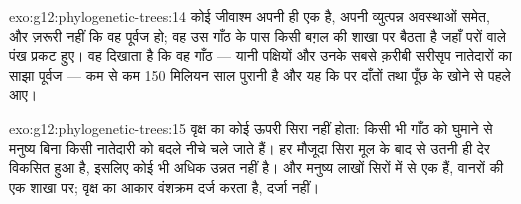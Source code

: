 \begin{solution}{exo:g12:phylogenetic-trees:14}
कोई जीवाश्म अपनी ही एक  है, अपनी व्युत्पन्न अवस्थाओं समेत, और ज़रूरी
नहीं कि वह पूर्वज  हो; वह उस गाँठ के पास किसी बग़ल की शाखा पर बैठता है
जहाँ परों वाले पंख प्रकट हुए। वह दिखाता है कि वह गाँठ --- यानी पक्षियों और
उनके सबसे क़रीबी सरीसृप नातेदारों का साझा पूर्वज --- कम से कम 150 मिलियन
साल पुरानी है और यह कि पर दाँतों तथा पूँछ के खोने से पहले आए।
\end{solution}

\begin{solution}{exo:g12:phylogenetic-trees:15}
वृक्ष का कोई ऊपरी सिरा नहीं होता: किसी भी गाँठ को घुमाने से मनुष्य बिना
किसी नातेदारी को बदले नीचे चले जाते हैं। हर मौजूदा सिरा मूल के बाद से उतनी
ही देर विकसित हुआ है, इसलिए कोई भी अधिक उन्नत नहीं है। और मनुष्य लाखों
सिरों में से एक हैं, वानरों की एक शाखा पर; वृक्ष का आकार वंशक्रम दर्ज करता
है, दर्जा नहीं।
\end{solution}


